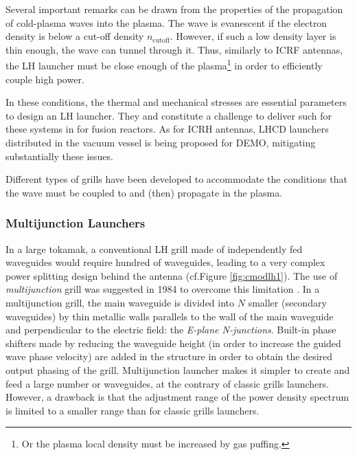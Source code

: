 {Several important remarks can be drawn from the properties of the propagation of cold-plasma waves into the plasma. The wave is evanescent if the electron density is below a cut-off density $n_{\mathrm{cutoff}}$. However, if such a low density layer is thin enough, the wave can tunnel through it. Thus, similarly to ICRF antennas, the LH launcher must be close enough of the plasma\footnote{Or the plasma local density must be increased by gas puffing.} in order to efficiently couple high power. 

In these conditions, the thermal and mechanical stresses are essential parameters to design an LH launcher. They and constitute a challenge to deliver such for these systems in for fusion reactors. As for ICRH antennas, LHCD launchers distributed in the vacuum vessel is being proposed for DEMO, mitigating substantially these issues.

Different types of grills have been developed to accommodate the conditions that the wave must be coupled to and (then) propagate in the plasma. 

%

\subsubsection{Multijunction Launchers}\label{sec:multijunction}
In a large tokamak, a conventional LH grill made of independently fed waveguides would require hundred of waveguides, leading to a very complex power splitting design behind the antenna (cf.Figure \ref{fig:cmodlh1}). The use of \emph{multijunction} grill was suggested in 1984 to overcome this limitation . In a multijunction grill, the main waveguide is divided into $N$ smaller (secondary waveguides) by thin metallic walls parallels to the wall of the main waveguide and perpendicular to the electric field: the \emph{E-plane N-junctions}. Built-in phase shifters made by reducing the waveguide height (in order to increase the guided wave phase velocity) are added in the structure in order to obtain the desired output phasing of the grill. Multijunction launcher makes it simpler to create and feed a large number or waveguides, at the contrary of classic grills launchers. However, a drawback is that the adjustment range of the power density spectrum is limited to a smaller range than for classic grills launchers.

}
